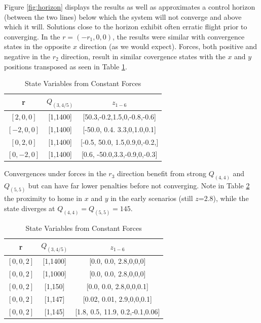 \documentclass{article}
\begin{document}
\begin{multicols}{2}
\noindent Figure \ref{fig:horizon} displays the results as well as approximates a control horizon (between the two lines) below which the system will not converge and above which it will.  Solutions close to the horizon exhibit often erratic flight prior to converging.  In the $r=(-r_1,0,0)$, the results were similar with convergence states in the opposite $x$ direction (as we would expect).  Forces, both positive and negative in the $r_2$ direction, result in similar covergence states with the $x$ and $y$ positions transposed as seen in Table \ref{tab:STFCF1}.

\begin{table}[H] %
\begin{centering}
\begin{tabular}{|ccc|}
\hline
r & $Q_{(3,4/5)}$ & $z_{1-6}$   \\
\hline
 $[2,0,0]$&[1,1400]&[50.3,-0.2,1.5,0,-0.8,-0.6]\\
 $[-2,0,0]$&[1,1400]&[-50.0, 0.4. 3.3,0,1.0,0.1]\\
 $[0,2,0]$&[1,1400]&[-0.5, 50.0, 1.5,0.9,0,-0.2,]\\
 $[0,-2,0]$&[1,1400]&[0.6, -50.0,3.3,-0.9,0,-0.3]\\ 
\hline
\end{tabular}
\caption{State Variables from Constant Forces}
\label{tab:STFCF1}
\end{centering}
\end{table}

\noindent Convergences under forces in the $r_3$ direction benefit from strong $Q_{(4,4)}$ and $Q_{(5,5)}$ but can have far lower penalties before not converging.  Note in Table \ref{tab:STFCF2} the proximity to home in $x$ and $y$ in the early scenarios (still $z$=2.8), while the state diverges at $Q_{(4,4)}=Q_{(5,5)}=145$.
\begin{table}[H] %
\begin{centering}
\begin{tabular}{|ccc|}
\hline
r & $Q_{(3,4/5)}$ & $z_{1-6}$   \\
\hline
 $[0,0,2]$&[1,1400]&[0.0, 0.0, 2.8,0,0,0]\\
 $[0,0,2]$&[1,1000]&[0.0, 0.0, 2.8,0,0,0]\\
$[0,0,2]$&[1,150]&[0.0, 0.0, 2.8,0,0,0.1]\\
$[0,0,2]$&[1,147]&[0.02, 0.01, 2.9,0,0,0.1]\\
$[0,0,2]$&[1,145]&[1.8, 0.5, 11.9, 0.2,-0.1,0.06]\\
 \hline
\end{tabular}
\caption{State Variables from Constant Forces}
\label{tab:STFCF2}
\end{centering}
\end{table}


\end{multicols}
\end{document}
